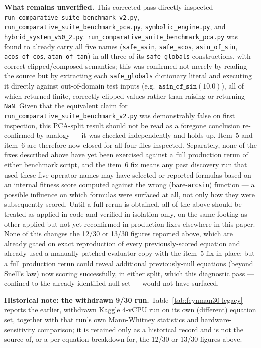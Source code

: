 \documentclass[twoside,11pt]{article}
\begin{document}
\textbf{What remains unverified.} This corrected pass directly inspected
\texttt{run\_comparative\_suite\_benchmark\_v2.py},
\texttt{run\_comparative\_suite\_benchmark\_pca.py},
\texttt{symbolic\_engine.py}, and \texttt{hybrid\_system\_v50\_2.py}.
\texttt{run\_comparative\_suite\_benchmark\_pca.py} was found to already
carry all five names (\texttt{safe\_asin}, \texttt{safe\_acos},
\texttt{asin\_of\_sin}, \texttt{acos\_of\_cos}, \texttt{atan\_of\_tan}) in
all three of its \texttt{safe\_globals} constructions, with correct
clipped/composed semantics; this was confirmed not merely by reading the
source but by extracting each \texttt{safe\_globals} dictionary literal
and executing it directly against out-of-domain test inputs (e.g.\
$\texttt{asin\_of\_sin}(10.0)$), all of which returned finite,
correctly-clipped values rather than raising or returning \texttt{NaN}.
Given that the equivalent claim for
\texttt{run\_comparative\_suite\_benchmark\_v2.py} was demonstrably false
on first inspection, this PCA-split result should not be read as a
foregone conclusion re-confirmed by analogy --- it was checked
independently and holds up. Item~5 and item~6 are therefore now closed for
all four files inspected. Separately, none of the fixes described above
have yet been exercised against a full production rerun of either
benchmark script, and the item~6 fix means any past discovery run that
used these five operator names may have selected or reported formulas
based on an internal fitness score computed against the wrong
(bare-\texttt{arcsin}) function --- a possible influence on which formulas
were surfaced at all, not only how they were subsequently scored. Until a
full rerun is obtained, all of the above should be treated as
applied-in-code and verified-in-isolation only, on the same footing as
other applied-but-not-yet-reconfirmed-in-production fixes elsewhere in
this paper. None of this changes the 12/30 or 13/30 figures reported
above, which are already gated on exact reproduction of every
previously-scored equation and already used a manually-patched evaluator
copy with the item~5 fix in place; but a full production rerun could
reveal additional previously-null equations (beyond Snell's law) now
scoring successfully, in either split, which this diagnostic pass ---
confined to the already-identified null set --- would not have surfaced.

\textbf{Historical note: the withdrawn 9/30 run.}\quad
Table~\ref{tab:feynman30-legacy} reports the earlier, withdrawn Kaggle
4-vCPU run on its own (different) equation set, together with that run's
own Mann-Whitney statistics and hardware-sensitivity comparison; it is
retained only as a historical record and is not the source of, or a
per-equation breakdown for, the 12/30 or 13/30 figures above.
\end{document}
